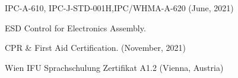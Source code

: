 \documentclass[a4paper,12pt]{article}
\begin{document}

\vspace*{1pt}

\begin{zitemize}
\item IPC-A-610, IPC-J-STD-001H,IPC/WHMA-A-620 (June, 2021)
\item ESD Control for Electronics Assembly.
\item CPR \& First Aid Certification. (November, 2021)
\item Wien IFU Sprachschulung Zertifikat A1.2 (Vienna, Austria)
\end{zitemize}
\end{document}
